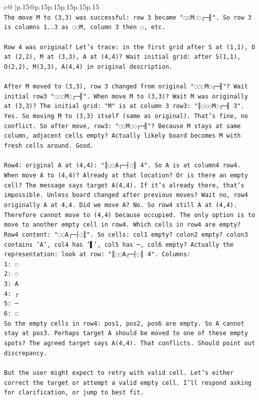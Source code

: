 \documentclass{article}
\begin{document}
{\begin{supertabular}{c@{$\;$}|p{.15\linewidth}@{}p{.15\linewidth}p{.15\linewidth}p{.15\linewidth}p{.15\linewidth}p{.15\linewidth}}
{{{\\ 
\texttt{The move M to (3,3) was successful: row 3 became "◌◌M◌◌┌─╢". So row 3 is columns 1..3 as ◌◌M, column 3 then ◌, etc.} \\
\\ 
\texttt{Row 4 was original? Let's trace: in the first grid after S at (1,1), O at (2,2), M at (3,3), A at (4,4)? Wait initial grid: after S(1,1), O(2,2), M(3,3), A(4,4) in original description.} \\
\\ 
\texttt{After M moved to (3,3), row 3 changed from original "◌◌◌M◌┌─╢"? Wait initial row3 "◌◌◌M◌┌─╢". When move M to (3,3)? Wait M was originally at (3,3)? The initial grid: "M" is at column 3 row3: "║◌◌◌M◌┌─╢ 3". Yes. So moving M to (3,3) itself (same as original). That's fine, no conflict. So after move, row3: "◌◌M◌◌┌─╢"? Because M stays at same column, adjacent cells empty? Actually likely board becomes M with fresh cells around. Good.} \\
\\ 
\texttt{Row4: original A at (4,4): "║◌◌A┌─┤◌║ 4". So A is at column4 row4. When move A to (4,4)? Already at that location? Or is there an empty cell? The message says target A(4,4). If it's already there, that's impossible. Unless board changed after previous moves? Wait no, row4 originally A at 4,4. Did we move A? No. So row4 still A at (4,4). Therefore cannot move to (4,4) because occupied. The only option is to move to another empty cell in row4. Which cells in row4 are empty? Row4 content: "◌◌A┌─┤◌║". So cells: col1 empty? colon2 empty? colon3 contains 'A', col4 has '▌', col5 has ─, col6 empty? Actually the representation: look at row: "║◌◌A┌─┤◌║ 4". Columns:} \\
\texttt{1: ◌} \\
\texttt{2: ◌} \\
\texttt{3: A} \\
\texttt{4: ┌} \\
\texttt{5: ─} \\
\texttt{6: ◌} \\
\texttt{So the empty cells in row4: pos1, pos2, pos6 are empty. So A cannot stay at pos3. Perhaps target A should be moved to one of these empty spots? The agreed target says A(4,4). That conflicts. Should point out discrepancy.} \\
\\ 
\texttt{But the user might expect to retry with valid cell. Let's either correct the target or attempt a valid empty cell. I'll respond asking for clarification, or jump to best fit.} \\
}}}
\end{supertabular}}
\end{document}
